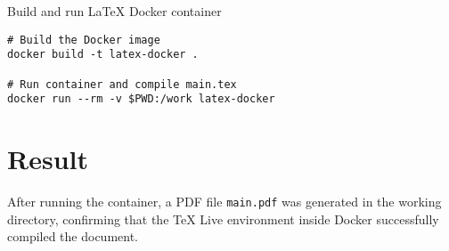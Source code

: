 \begin{listing}[H]
\caption{Build and run LaTeX Docker container}
\begin{verbatim}
# Build the Docker image
docker build -t latex-docker .

# Run container and compile main.tex
docker run --rm -v $PWD:/work latex-docker
\end{verbatim}
\end{listing}

\section{Result}
After running the container, a PDF file \texttt{main.pdf} was generated 
in the working directory, confirming that the TeX Live environment 
inside Docker successfully compiled the document.
